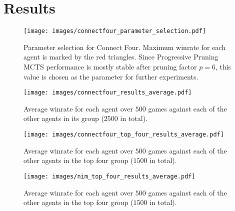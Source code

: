 \section{Results}

\begin{figure}[H]
    \centering
    \texttt{[image: images/connectfour\_parameter\_selection.pdf]}
    \caption{Parameter selection for Connect Four. Maximum winrate for each
    agent is marked by the red triangles. Since Progressive Pruning MCTS 
    performance is mostly stable after pruning factor $p=6$, this value
    is chosen as the parameter for further experiments.}
    \label{fig:parameter_selection}
\end{figure}

\begin{figure}[H]
    \centering
    \texttt{[image: images/connectfour\_results\_average.pdf]}
    \caption{Average winrate for each agent over $500$ games against each of
    the other agents in its group ($2500$ in total).}
    \label{fig:c4_results_average} 
\end{figure}

\begin{figure}[H]
    \centering
    \texttt{[image: images/connectfour\_top\_four\_results\_average.pdf]}
    \caption{Average winrate for each agent over $500$ games against each of
    the other agents in the top four group ($1500$ in total).}
    \label{fig:c4_top_four_results_average}
\end{figure}

\begin{figure}[H]
    \centering
    \texttt{[image: images/nim\_top\_four\_results\_average.pdf]}
    \caption{Average winrate for each agent over $500$ games against each of
    the other agents in the top four group ($1500$ in total).}
    \label{fig:nim_top_four_results_average}
\end{figure}
